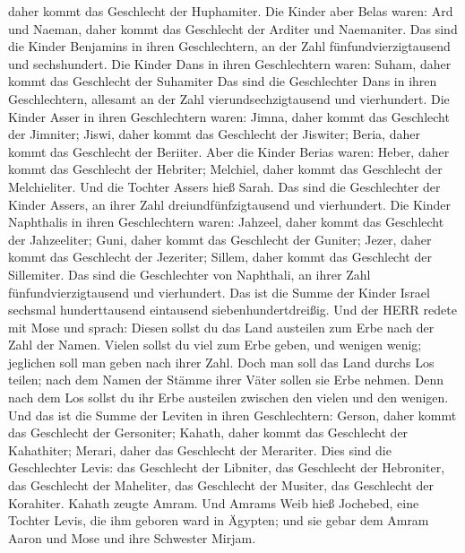 daher kommt das Geschlecht der Huphamiter.  Die Kinder aber
Belas waren: Ard und Naeman, daher kommt das Geschlecht der Arditer und
Naemaniter.  Das sind die Kinder Benjamins in ihren
Geschlechtern, an der Zahl fünfundvierzigtausend und sechshundert.
 Die Kinder Dans in ihren Geschlechtern waren: Suham, daher
kommt das Geschlecht der Suhamiter  Das sind die
Geschlechter Dans in ihren Geschlechtern, allesamt an der Zahl
vierundsechzigtausend und vierhundert.  Die Kinder Asser in
ihren Geschlechtern waren: Jimna, daher kommt das Geschlecht der
Jimniter; Jiswi, daher kommt das Geschlecht der Jiswiter; Beria, daher
kommt das Geschlecht der Beriiter.  Aber die Kinder Berias
waren: Heber, daher kommt das Geschlecht der Hebriter; Melchiel, daher
kommt das Geschlecht der Melchieliter.  Und die Tochter
Assers hieß Sarah.  Das sind die Geschlechter der Kinder
Assers, an ihrer Zahl dreiundfünfzigtausend und vierhundert.
 Die Kinder Naphthalis in ihren Geschlechtern waren:
Jahzeel, daher kommt das Geschlecht der Jahzeeliter; Guni, daher kommt
das Geschlecht der Guniter;  Jezer, daher kommt das
Geschlecht der Jezeriter; Sillem, daher kommt das Geschlecht der
Sillemiter.  Das sind die Geschlechter von Naphthali, an
ihrer Zahl fünfundvierzigtausend und vierhundert.  Das ist
die Summe der Kinder Israel sechsmal hunderttausend eintausend
siebenhundertdreißig.  Und der HERR redete mit Mose und
sprach:  Diesen sollst du das Land austeilen zum Erbe nach
der Zahl der Namen.  Vielen sollst du viel zum Erbe geben,
und wenigen wenig; jeglichen soll man geben nach ihrer Zahl.
 Doch man soll das Land durchs Los teilen; nach dem Namen
der Stämme ihrer Väter sollen sie Erbe nehmen.  Denn nach
dem Los sollst du ihr Erbe austeilen zwischen den vielen und den
wenigen.  Und das ist die Summe der Leviten in ihren
Geschlechtern: Gerson, daher kommt das Geschlecht der Gersoniter;
Kahath, daher kommt das Geschlecht der Kahathiter; Merari, daher das
Geschlecht der Merariter.  Dies sind die Geschlechter
Levis: das Geschlecht der Libniter, das Geschlecht der Hebroniter, das
Geschlecht der Maheliter, das Geschlecht der Musiter, das Geschlecht der
Korahiter. Kahath zeugte Amram.  Und Amrams Weib hieß
Jochebed, eine Tochter Levis, die ihm geboren ward in Ägypten; und sie
gebar dem Amram Aaron und Mose und ihre Schwester Mirjam. 
